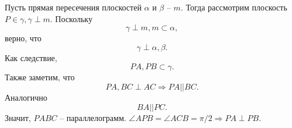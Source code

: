 Пусть прямая пересечения плоскостей $\alpha$ и $\beta$ -- $m$. Тогда рассмотрим плоскость $P \in \gamma, \gamma \perp m$. Поскольку 
\begin{equation}
	\gamma \perp m, m \subset \alpha,
\end{equation}
верно, что
\begin{equation}
	\gamma \perp \alpha, \beta.
\end{equation}
Как следствие,
\begin{equation}
	PA, PB \subset \gamma.
\end{equation}
Также заметим, что
\begin{equation}
	PA, BC\perp AC \Rightarrow PA||BC.
\end{equation}
Аналогично
\begin{equation}
	BA||PC.
\end{equation}
Значит, $PABC$ -- параллелограмм. $\angle APB = \angle ACB = \pi/2 \Rightarrow PA\perp PB$.